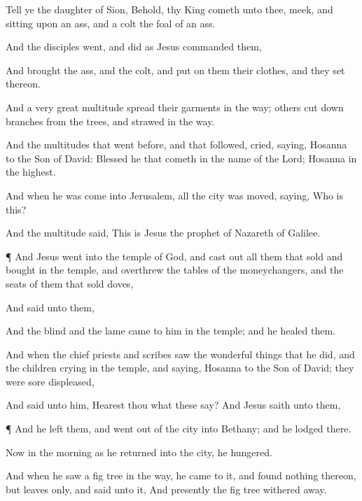 {Tell
ye the
daughter of
Sion,
Behold,
thy
King
cometh unto
thee,
meek,
and
sitting
upon an
ass,
and a
colt the
foal of an
ass.

And the
disciples
went,
and
did
as
Jesus
commanded
them,

And
brought the
ass,
and the
colt,
and
put
on
them
their
clothes,
and they
set
{}
thereon.

And
a very
great
multitude
spread
their
garments
in the
way;
others cut
down
branches
from the
trees,
and
strawed
{}
in the
way.

And the
multitudes that went
before,
and that
followed,
cried,
saying,
Hosanna to the
Son of
David:
Blessed
{} he that
cometh
in the
name of the
Lord;
Hosanna
in the
highest.

And
when
he was
come
into
Jerusalem,
all the
city was
moved,
saying,
Who
is
this?

And the
multitude
said,
This
is
Jesus the
prophet
of
Nazareth of
Galilee.


\par }{\PP {}¶
And
Jesus
went
into the
temple of
God,
and cast
out
all them that
sold
and
bought
in the
temple,
and
overthrew the
tables of the
moneychangers,
and the
seats of them that
sold
doves,

And
said unto
them,
{}

And the
blind
and the
lame
came to
him
in the
temple;
and he
healed
them.

And
when the chief
priests
and
scribes
saw the wonderful
things
that he
did,
and the
children
crying
in the
temple,
and
saying,
Hosanna to the
Son of
David; they were sore
displeased,

And
said unto
him, Hearest
thou
what
these
say?
And
Jesus
saith unto
them,
{}


\par }{\PP {}¶
And he
left
them, and
went
out of the
city
into
Bethany;
and he
lodged
there.

Now in the
morning as he
returned
into the
city, he
hungered.

And when he
saw
a fig
tree
in the
way, he
came
to
it,
and
found
nothing
thereon,
but
leaves
only,
and
said unto
it,
{}
And
presently the fig
tree withered
away.

}

